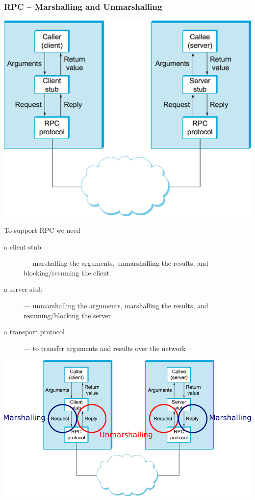 \documentclass{beamer}\mode<presentation>{\usetheme{AMSBolognaFC}}
\begin{document}
\begin{frame}[allowframebreaks]
    \frametitle{RPC -- Marshalling and Unmarshalling}

    \centering

    \includegraphics[width=.7\linewidth]{img/rpc-2.png}

    \framebreak

    \begin{block}{To support RPC we need}
        \begin{description}
            \item[a client stub] --- marshalling the arguments, unmarshalling the results, and blocking/resuming the client

            \item[a server stub] --- unmarshalling the arguments, marshalling the results, and resuming/blocking the server

            \item[a transport protocol] --- to transfer arguments and results over the network
        \end{description}
    \end{block}

    \framebreak

    \includegraphics[width=\linewidth]{img/rpc-3.pdf}


\end{frame}
\end{document}
